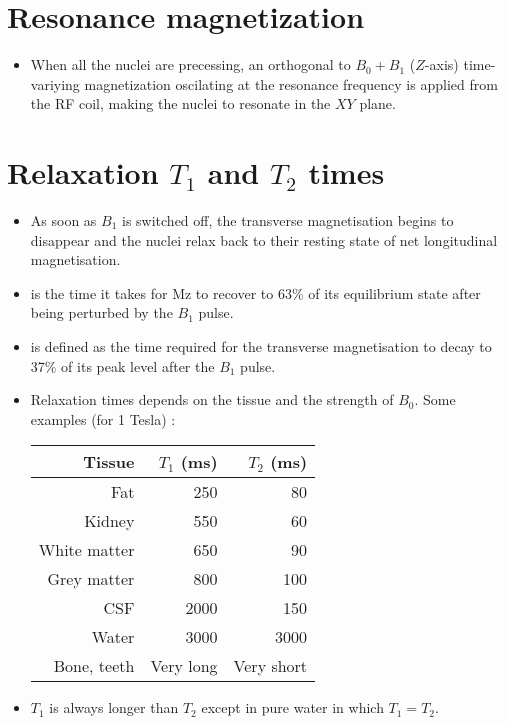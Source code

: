\section{Resonance magnetization}
\begin{itemize}
\item When all the nuclei are precessing, an orthogonal to $B_0+B_1$
  ($Z$-axis) time-variying magnetization oscilating at the resonance
  frequency is applied from the RF coil, making the nuclei to resonate
  in the $XY$ plane.
\end{itemize}

\section{Relaxation $T_1$ and $T_2$ times}
\begin{itemize}
\item As soon as $B_1$ is switched off, the transverse magnetisation
  begins to disappear and the nuclei relax back to their resting state
  of net longitudinal magnetisation. 
\item {} is the time it takes for Mz to recover to 63\% of its
  equilibrium state after being perturbed by the $B_1$ pulse.
\item {} is
  defined as the time required for the transverse magnetisation to
  decay to 37\% of its peak level after the $B_1$ pulse.
\end{itemize}

\begin{itemize}
\item Relaxation times depends on the tissue and the strength of
  $B_0$. Some examples (for 1 Tesla) \cite{abdulla2025MRI_T1T2}:
\begin{center}
  \begin{tabular}{r|rr}
    Tissue & $T_1$ (ms) & $T_2$ (ms) \\
    \hline
    Fat & 250 & 80 \\
    Kidney & 550 &  60 \\
    White matter & 650 & 90 \\
    Grey matter & 800 & 100 \\
    CSF & 2000 & 150 \\
    Water & 3000 & 3000 \\
    Bone, teeth & Very long & Very short
  \end{tabular}
\end{center}
\item $T_1$ is always longer than $T_2$ except in pure water in which
  $T_1=T_2$.
\end{itemize}

